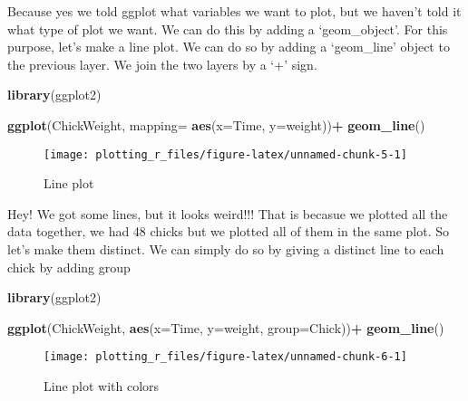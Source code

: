 \documentclass[
]{book}
\newenvironment{Shaded}{\begin{snugshade}}{\end{snugshade}}
\newcommand{\DataTypeTok}[1]{\textcolor[rgb]{0.13,0.29,0.53}{#1}}
\newcommand{\KeywordTok}[1]{\textcolor[rgb]{0.13,0.29,0.53}{\textbf{#1}}}
\newcommand{\NormalTok}[1]{#1}
\newcommand{\OperatorTok}[1]{\textcolor[rgb]{0.81,0.36,0.00}{\textbf{#1}}}
\newcommand{\StringTok}[1]{\textcolor[rgb]{0.31,0.60,0.02}{#1}}
\begin{document}
Because yes we told ggplot what variables we want to plot, but we haven't told it what type of plot we want.
We can do this by adding a `geom\_object'. For this purpose, let's make a line plot. We can do so by adding a `geom\_line' object to the previous layer. We join the two layers by a `+' sign.

\begin{Shaded}
\begin{Highlighting}[]
\KeywordTok{library}\NormalTok{(ggplot2)}

\KeywordTok{ggplot}\NormalTok{(ChickWeight, }\DataTypeTok{mapping=} \KeywordTok{aes}\NormalTok{(}\DataTypeTok{x=}\NormalTok{Time, }\DataTypeTok{y=}\NormalTok{weight))}\OperatorTok{+}
\StringTok{  }\KeywordTok{geom_line}\NormalTok{()}
\end{Highlighting}
\end{Shaded}

\begin{figure}

{\centering \texttt{[image: plotting\_r\_files/figure-latex/unnamed-chunk-5-1]} 

}

\caption{Line plot}\label{fig:unnamed-chunk-5}
\end{figure}

Hey! We got some lines, but it looks weird!!!
That is becasue we plotted all the data together, we had 48 chicks but we plotted all of them in the same plot. So let's make them distinct. We can simply do so by giving a distinct line to each chick by adding group

\begin{Shaded}
\begin{Highlighting}[]
\KeywordTok{library}\NormalTok{(ggplot2)}

\KeywordTok{ggplot}\NormalTok{(ChickWeight, }\KeywordTok{aes}\NormalTok{(}\DataTypeTok{x=}\NormalTok{Time, }\DataTypeTok{y=}\NormalTok{weight, }\DataTypeTok{group=}\NormalTok{Chick))}\OperatorTok{+}
\StringTok{  }\KeywordTok{geom_line}\NormalTok{()}
\end{Highlighting}
\end{Shaded}

\begin{figure}

{\centering \texttt{[image: plotting\_r\_files/figure-latex/unnamed-chunk-6-1]} 

}

\caption{Line plot with colors}\label{fig:unnamed-chunk-6}
\end{figure}
\end{document}
